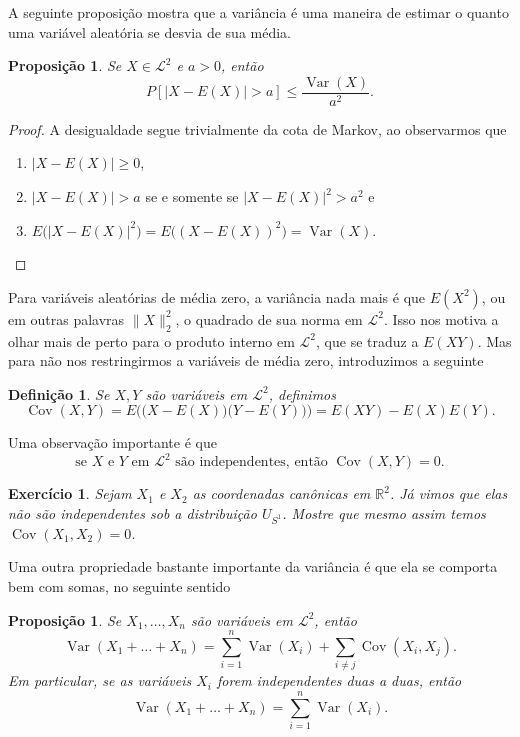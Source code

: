 \documentclass[reqno, final]{book}
\newcommand*\1{\mathds{1}}
\newtheorem{proposition}[theorem]{Proposição}
\newtheorem{definition}[theorem]{Definição}
\newtheorem{exercise}[example]{Exercício}
\DeclareMathOperator{\Cov}{Cov}
\DeclareMathOperator{\Var}{Var}
\begin{document}
A seguinte proposição mostra que a variância é uma maneira de estimar o quanto uma variável aleatória se desvia de sua média.
\begin{proposition}
  Se $X \in \mathcal{L}^2$ e $a > 0$, então
  \begin{equation}
    P [ |X - E(X)| > a] \leq \frac{\Var(X)}{a^2}.
  \end{equation}
\end{proposition}

\begin{proof}
  A desigualdade segue trivialmente da cota de Markov, ao observarmos que
  \begin{enumerate}[\quad a)]
  \item $|X - E(X)| \geq 0$,
  \item $|X - E(X)| > a$ se e somente se $|X - E(X)|^2 > a^2$ e
  \item $E\big(|X - E(X)|^2\big) = E\big((X - E(X))^2\big) = \Var(X)$.
  \end{enumerate}
\end{proof}

Para variáveis aleatórias de média zero, a variância nada mais é que $E(X^2)$, ou em outras palavras $\lVert X \rVert^2_2$, o quadrado de sua norma em $\mathcal{L}^2$.
Isso nos motiva a olhar mais de perto para o produto interno em $\mathcal{L}^2$, que se traduz a $E(XY)$.
Mas para não nos restringirmos a variáveis de média zero, introduzimos a seguinte

\begin{definition}
  Se $X, Y$ são variáveis em $\mathcal{L}^2$, definimos
  \begin{equation}
    \Cov(X,Y) = E\Big( \big(X - E(X)\big) \big(Y - E(Y)\big) \Big) = E(XY) - E(X)E(Y).
  \end{equation}
\end{definition}

Uma observação importante é que
\begin{equation}
  \text{se $X$ e $Y$ em $\mathcal{L}^2$ são independentes, então $\Cov(X,Y) = 0$.}
\end{equation}

\begin{exercise}
  Sejam $X_1$ e $X_2$ as coordenadas canônicas em $\mathbb{R}^2$.
  Já vimos que elas não são independentes sob a distribuição $U_{S^1}$.
  Mostre que mesmo assim temos $\Cov(X_1, X_2) = 0$.
\end{exercise}

Uma outra propriedade bastante importante da variância é que ela se comporta bem com somas, no seguinte sentido
\begin{proposition}
  Se $X_1, \dots, X_n$ são variáveis em $\mathcal{L}^2$, então
  \begin{equation}
    \Var(X_1 + \dots + X_n) = \sum_{i=1}^n \Var(X_i) + \sum_{i \neq j} \Cov(X_i, X_j).
  \end{equation}
  Em particular, se as variáveis $X_i$ forem independentes duas a duas, então
  \begin{equation}
    \Var(X_1 + \dots + X_n) = \sum_{i=1}^n \Var(X_i).
  \end{equation}
\end{proposition}
\end{document}
